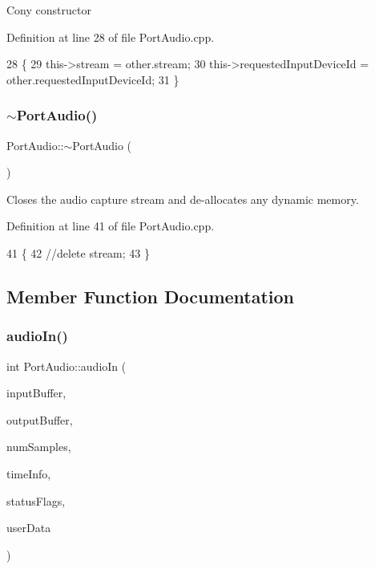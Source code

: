 Cony constructor 

Definition at line 28 of file Port\+Audio.\+cpp.


\begin{DoxyCode}
28                                            \{
29     this->stream = other.stream;
30     this->requestedInputDeviceId = other.requestedInputDeviceId;
31 \}
\end{DoxyCode}
\mbox{\label{classPortAudio_a5f80fdff2377981fcd42fae42d4b65c3}} 
\subsubsection{\texorpdfstring{$\sim$\+Port\+Audio()}{~PortAudio()}}
{\footnotesize\ttfamily Port\+Audio\+::$\sim$\+Port\+Audio (\begin{DoxyParamCaption}{ }\end{DoxyParamCaption})}

Closes the audio capture stream and de-\/allocates any dynamic memory. 

Definition at line 41 of file Port\+Audio.\+cpp.


\begin{DoxyCode}
41                       \{
42     \textcolor{comment}{//delete stream;}
43 \}
\end{DoxyCode}


\subsection{Member Function Documentation}
\mbox{\label{classPortAudio_a006e388f2b3e886377390e1a97580d53}} 
\subsubsection{\texorpdfstring{audio\+In()}{audioIn()}}
{\footnotesize\ttfamily int Port\+Audio\+::audio\+In (\begin{DoxyParamCaption}\item[{const void $\ast$}]{input\+Buffer,  }\item[{void $\ast$}]{output\+Buffer,  }\item[{unsigned long}]{num\+Samples,  }\item[{const Pa\+Stream\+Callback\+Time\+Info $\ast$}]{time\+Info,  }\item[{Pa\+Stream\+Callback\+Flags}]{status\+Flags,  }\item[{void $\ast$}]{user\+Data }\end{DoxyParamCaption})\hspace{0.3cm}{\ttfamily [static]}}

